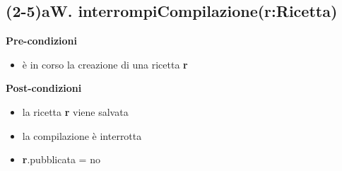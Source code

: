 \documentclass[12pt]{extarticle}
\begin{document}
\subsection*{(2-5)aW. interrompiCompilazione(r:Ricetta)}

\textbf{Pre-condizioni}
\begin{itemize}
  \item è in corso la creazione di una ricetta  \textbf{r}
\end{itemize}
\textbf{Post-condizioni}
\begin{itemize}
  \item la ricetta  \textbf{r} viene salvata
  \item la compilazione è interrotta
  \item \textbf{r}.pubblicata = no
\end{itemize}
\end{document}
